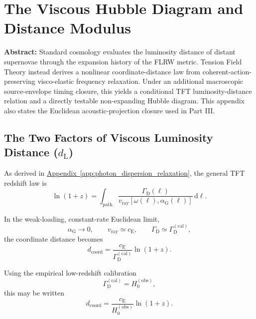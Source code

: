 \chapter{The Viscous Hubble Diagram and Distance Modulus}
\label{app:hubble_diagram}

\noindent\textbf{Abstract:} Standard cosmology evaluates the luminosity distance of distant supernovae through the expansion history of the FLRW metric. Tension Field Theory instead derives a nonlinear coordinate-distance law from coherent-action-preserving visco-elastic frequency relaxation. Under an additional macroscopic source-envelope timing closure, this yields a conditional TFT luminosity-distance relation and a directly testable non-expanding Hubble diagram. This appendix also states the Euclidean acoustic-projection closure used in Part III.

\section{The Two Factors of Viscous Luminosity Distance ($d_{\mathrm{L}}$)}

As derived in \hyperref[app:photon_dispersion_relaxation]{Appendix~\ref*{app:photon_dispersion_relaxation}}, the general TFT redshift law is
\begin{equation}
    \ln(1+z)
    =
    \int_{\mathrm{path}}
    \frac{\Gamma_{\mathrm{D}}(\ell)}
    {v_{\mathrm{ray}}\!\left[\omega(\ell),\alpha_{\mathrm{G}}(\ell)\right]}
    \,\mathrm{d}\ell .
\end{equation}

In the weak-loading, constant-rate Euclidean limit,
\begin{equation}
    \alpha_{\mathrm{G}}\to0,
    \qquad
    v_{\mathrm{ray}}\simeq c_{\mathrm{E}},
    \qquad
    \Gamma_{\mathrm{D}}\simeq\Gamma_{\mathrm{D}}^{(\mathrm{cal})},
\end{equation}
the coordinate distance becomes
\begin{equation}
    d_{\mathrm{coord}}
    =
    \frac{c_{\mathrm{E}}}{\Gamma_{\mathrm{D}}^{(\mathrm{cal})}}
    \ln(1+z).
\end{equation}

Using the empirical low-redshift calibration
\begin{equation}
    \Gamma_{\mathrm{D}}^{(\mathrm{cal})}
    =
    H_0^{(\mathrm{obs})},
\end{equation}
this may be written
\begin{equation}
    d_{\mathrm{coord}}
    =
    \frac{c_{\mathrm{E}}}{H_0^{(\mathrm{obs})}}
    \ln(1+z).
\end{equation}

